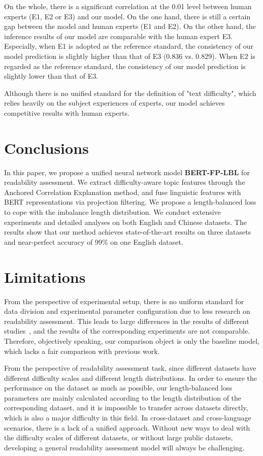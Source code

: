 \documentclass[11pt]{article}
\begin{document}
On the whole, there is a significant correlation at the 0.01 level between human experts (E1, E2 or E3) and our model.
On the one hand, there is still a certain gap between the model and human experts (E1 and E2).
On the other hand, the inference results of our model are comparable with the human expert E3. Especially, when E1 is adopted as the reference standard, the consistency of our model prediction is slightly higher than that of E3 (0.836 vs. 0.829). When E2 is regarded as the reference standard, the consistency of our model prediction is slightly lower than that of E3.

Although there is no unified standard for the definition of "text difficulty", which relies heavily on the subject experiences of experts, our model achieves competitive results with human experts.


\section{Conclusions}
In this paper, we propose a unified neural network model \textbf{BERT-FP-LBL} for readability assessment. We extract difficulty-aware topic features through the Anchored Correlation Explanation method, and fuse linguistic features with BERT representations via projection filtering. We propose a length-balanced loss to cope with the imbalance length distribution. 
We conduct extensive experiments and detailed analyses on both English and Chinese datasets. The results show that our method achieves state-of-the-art results on three datasets and near-perfect accuracy of 99\% on one English dataset. 


\section*{Limitations}
From the perspective of experimental setup, there is no uniform standard for data division and experimental parameter configuration due to less research on readability assessment. This leads to large differences in the results of different studies~\cite{qiu2021learning,martinc2021supervised,lee2021pushing}, and the results of the corresponding experiments are not comparable. Therefore, objectively speaking, our comparison object is only the baseline model, which lacks a fair comparison with previous work.


From the perspective of readability assessment task, since different datasets have different difficulty scales and different length distributions. In order to ensure the performance on the dataset as much as possible, our length-balanced loss parameters are mainly calculated according to the length distribution of the corresponding dataset, and it is impossible to transfer across datasets directly, which is also a major difficulty in this field. In cross-dataset and cross-language scenarios, there is a lack of a unified approach. Without new ways to deal with the difficulty scales of different datasets, or without large public datasets, developing a general readability assessment model will always be challenging.
\end{document}
